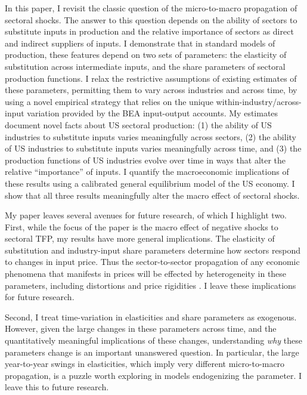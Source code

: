 \documentclass[11pt]{article}
\begin{document}
In this paper, I revisit the classic question of the micro-to-macro propagation of sectoral shocks. The answer to this question depends on the ability of sectors to substitute inputs in production and the relative importance of sectors as direct and indirect suppliers of inputs. I demonstrate that in standard models of production, these features depend on two sets of parameters: the elasticity of substitution across intermediate inputs, and the share parameters of sectoral production functions. I relax the restrictive assumptions of existing estimates of these parameters, permitting them to vary across industries and across time, by using a novel empirical strategy that relies on the unique within-industry/across-input variation provided by the BEA input-output accounts. My estimates document novel facts about US sectoral production: (1) the ability of US industries to substitute inputs varies meaningfully across sectors, (2) the ability of US industries to substitute inputs varies meaningfully across time, and (3) the production functions of US industries evolve over time in ways that alter the relative ``importance'' of inputs. I quantify the macroeconomic implications of these results using a calibrated general equilibrium model of the US economy. I show that all three results meaningfully alter the macro effect of sectoral shocks. 

My paper leaves several avenues for future research, of which I highlight two. First, while the focus of the paper is the macro effect of negative shocks to sectoral TFP, my results have more general implications. The elasticity of substitution and industry-input share parameters determine how sectors respond to changes in input price. Thus the sector-to-sector propagation of any economic phenomena that manifests in prices will be effected by heterogeneity in these parameters, including distortions \citep{bigioDistortionsProductionNetworks2020} and price rigidities \citep{rubboNetworksPhillipsCurves2023} \citep{laoOptimalMonetaryPolicy2022}. I leave these implications for future research.

Second, I treat time-variation in elasticities and share parameters as exogenous. However, given the large changes in these parameters across time, and the quantitatively meaningful implications of these changes, understanding \textit{why} these parameters change is an important unanswered question. In particular, the large year-to-year swings in elasticities, which imply very different micro-to-macro propagation, is a puzzle worth exploring in models endogenizing the parameter. I leave this to future research.
\end{document}

